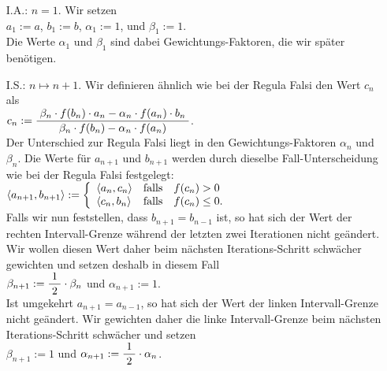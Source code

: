 \begin{enumerate}
\item[I.A.:] $n=1$.  Wir setzen 
             \\[0.2cm]
             \hspace*{1.3cm}
             $a_1 := a$, \quad $b_1 := b$, \quad $\alpha_1 := 1$, \quad und \quad $\beta_1 := 1$.
             \\[0.2cm]
             Die Werte $\alpha_1$ und $\beta_1$ sind dabei Gewichtungs-Faktoren, die wir sp\"ater ben\"otigen.
\item[I.S.:] $n \mapsto n+1$.  Wir definieren \"ahnlich wie bei der Regula Falsi den Wert $c_n$ als \\[0.2cm]
      \hspace*{1.3cm} 
      $c_n := \displaystyle\frac{\;\displaystyle\beta_n \cdot f(b_n) \cdot a_n - \alpha_n \cdot f(a_n) \cdot b_n\;}{\;\displaystyle
                     \beta_n \cdot f(b_n) - \alpha_n \cdot f(a_n)\;}
      $. 
      \\[0.3cm]
      Der Unterschied zur Regula Falsi liegt in den Gewichtungs-Faktoren $\alpha_n$ und $\beta_n$.
      Die Werte f\"ur $a_{n+1}$ und $b_{n+1}$ werden durch dieselbe Fall-Unterscheidung wie bei der Regula
      Falsi festgelegt:
      \\[0.2cm]
      \hspace*{1.3cm}
      $\pair(a_{n+1},b_{n+1}) := 
         \left\{ \begin{array}{ll}
                 \pair(a_n,c_n) & \mbox{falls}\quad f(c_n) >    0 \\
                 \pair(c_n,b_n) & \mbox{falls}\quad f(c_n) \leq 0. \\
                 \end{array}
         \right.
      $
      \\[0.2cm]
      Falls wir nun feststellen, dass $b_{n+1} = b_{n-1}$ ist, so hat sich der Wert der rechten
      Intervall-Grenze w\"ahrend der letzten zwei Iterationen nicht ge\"andert.  Wir wollen diesen Wert
      daher beim n\"achsten Iterations-Schritt 
      schw\"acher gewichten und setzen deshalb in diesem Fall
      \\[0.2cm]
      \hspace*{1.3cm}
      $\beta_{n+1} := \displaystyle\frac{\;\displaystyle1\;}{\;\displaystyle2\;} \cdot \beta_n$ \quad und \quad $\alpha_{n+1} := 1$.
      \\[0.2cm]
      Ist umgekehrt $a_{n+1} = a_{n-1}$, so hat sich der Wert der linken
      Intervall-Grenze nicht ge\"andert.  Wir gewichten daher die linke Intervall-Grenze beim n\"achsten
      Iterations-Schritt schw\"acher und setzen 
      \\[0.2cm]
      \hspace*{1.3cm}
      $\beta_{n+1} := 1$ \quad und \quad $\alpha_{n+1} := \displaystyle\frac{\;\displaystyle1\;}{\;\displaystyle2\;} \cdot \alpha_n$.
\end{enumerate}
